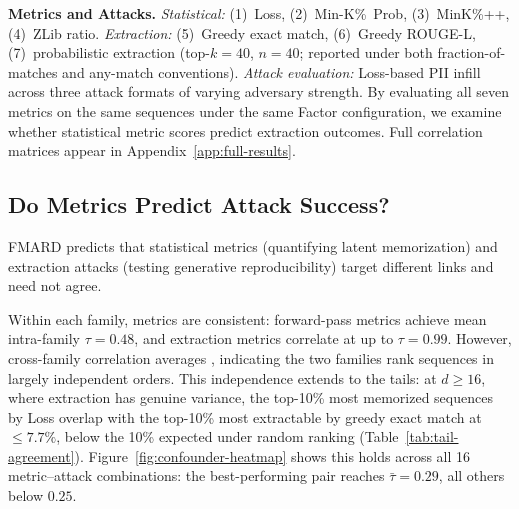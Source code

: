 \documentclass[11pt]{article}
\begin{document}
\textbf{Metrics and Attacks.}
\textit{Statistical:} (1)~Loss, (2)~Min-K\%~Prob, (3)~MinK\%++,
(4)~ZLib ratio.
\textit{Extraction:} (5)~Greedy exact match, (6)~Greedy ROUGE-L,
(7)~probabilistic extraction (top-$k{=}40$, $n{=}40$; reported under both
fraction-of-matches and any-match conventions).
\textit{Attack evaluation:} Loss-based PII infill across three attack formats
of varying adversary strength.
By evaluating all seven metrics on the same sequences under the same Factor
configuration, we examine whether statistical metric scores predict
extraction outcomes.
Full correlation matrices appear in Appendix~\ref{app:full-results}.


\subsection{Do Metrics Predict Attack Success?}
\label{sec:metric-attack}

FMARD predicts that statistical metrics (quantifying latent memorization) and
extraction attacks (testing generative reproducibility) target different links
and need not agree.

Within each family, metrics are consistent: forward-pass metrics achieve mean
intra-family $\tau = 0.48$, and extraction metrics correlate at up to
$\tau = 0.99$.
However, cross-family correlation averages , indicating the two families rank
sequences in largely independent orders.
This independence extends to the tails: at $d \geq 16$, where extraction has
genuine variance, the top-10\% most memorized sequences by Loss overlap with
the top-10\% most extractable by greedy exact match at $\leq 7.7\%$, below
the 10\% expected under random ranking (Table~\ref{tab:tail-agreement}).
Figure~\ref{fig:confounder-heatmap} shows this holds across all 16 metric--attack combinations: the best-performing pair reaches $\bar{\tau} = 0.29$, all others below $0.25$.
\end{document}
